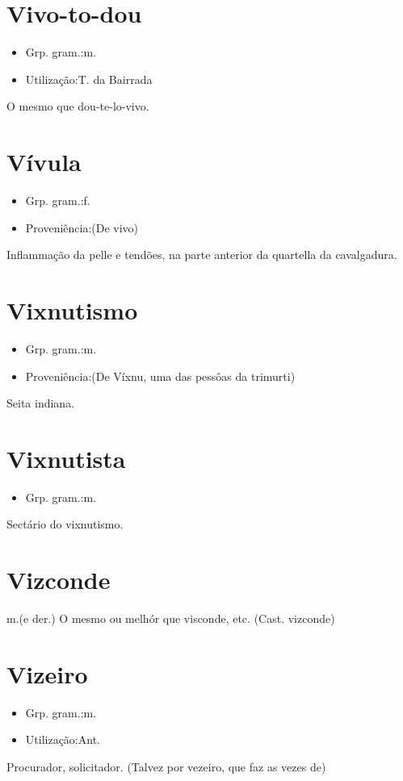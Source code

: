 \documentclass{article}
\begin{document}
\section{Vivo-to-dou}
\begin{itemize}
\item {Grp. gram.:m.}
\end{itemize}
\begin{itemize}
\item {Utilização:T. da Bairrada}
\end{itemize}
O mesmo que \textunderscore dou-te-lo-vivo\textunderscore .
\section{Vívula}
\begin{itemize}
\item {Grp. gram.:f.}
\end{itemize}
\begin{itemize}
\item {Proveniência:(De \textunderscore vivo\textunderscore )}
\end{itemize}
Inflammação da pelle e tendões, na parte anterior da quartella da cavalgadura.
\section{Vixnutismo}
\begin{itemize}
\item {Grp. gram.:m.}
\end{itemize}
\begin{itemize}
\item {Proveniência:(De \textunderscore Víxnu\textunderscore , uma das pessôas da trimurti)}
\end{itemize}
Seita indiana.
\section{Vixnutista}
\begin{itemize}
\item {Grp. gram.:m.}
\end{itemize}
Sectário do vixnutismo.
\section{Vizconde}
\textunderscore m.\textunderscore  (e der.)
O mesmo ou melhór que \textunderscore visconde\textunderscore , etc.
(Cast. \textunderscore vizconde\textunderscore )
\section{Vizeiro}
\begin{itemize}
\item {Grp. gram.:m.}
\end{itemize}
\begin{itemize}
\item {Utilização:Ant.}
\end{itemize}
Procurador, solicitador.
(Talvez por \textunderscore vezeiro\textunderscore , que faz as vezes de)
\end{document}
